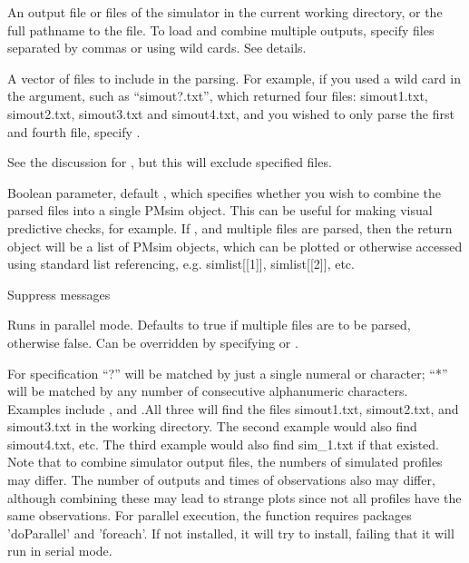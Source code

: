 \documentclass[a4paper]{book}
\begin{document}
\begin{Arguments}
\begin{ldescription}
\item[\code{file}] An output file or files of the simulator in the current working directory, or the full
pathname to the file.  To load and combine multiple outputs, specify files separated by commas
or using wild cards.  See details.

\item[\code{include}] A vector of files to include in the parsing.  For example, if you used a wild
card in the  argument, such as ``simout?.txt'', which returned four files:
simout1.txt, simout2.txt, simout3.txt and simout4.txt, and you wished to only parse the first
and fourth file, specify .

\item[\code{exclude}] See the discussion for , but this will exclude specified files.

\item[\code{combine}] Boolean parameter, default , which specifies whether you wish to combine
the parsed files into a single PMsim object.  This can be useful for making visual predictive
checks, for example.  If , and multiple files are parsed, then the return object 
will be a list of PMsim objects, which can be plotted or otherwise accessed using standard list
referencing, e.g. simlist[[1]], simlist[[2]], etc.

\item[\code{silent}] Suppress messages

\item[\code{parallel}] Runs in parallel mode.  Defaults to true if multiple files are to be parsed, otherwise false.
Can be overridden by specifying  or .
\end{ldescription}
\end{Arguments}
%
\begin{Details}\relax
For  specification ``?'' will be matched by just a single numeral or character; ``*'' will be
matched by any number of consecutive alphanumeric characters.  Examples include ,
 and .All three will find the files simout1.txt,
simout2.txt, and simout3.txt in the working directory. The second example would also find simout4.txt, etc.  The third 
example would also find sim\_1.txt if that existed. 
Note that to combine simulator output files, the numbers of simulated profiles may differ.
The number of outputs and times of observations also may differ, although combining these may lead to
strange plots since not all profiles have the same observations. 
For parallel execution, the function requires packages 'doParallel' and 'foreach'. If not installed, it will try to install, failing that it will run in serial mode.
\end{Details}
\end{document}
